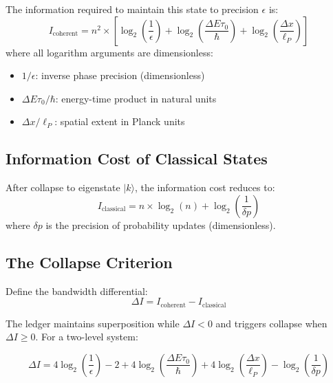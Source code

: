\documentclass[twocolumn,prd,amsmath,amssymb,aps,superscriptaddress,nofootinbib]{revtex4-2}
\begin{document}
The information required to maintain this state to precision $\epsilon$ is:
\begin{equation}
I_{\text{coherent}} = n^2 \times \left[\log_2\left(\frac{1}{\epsilon}\right) + \log_2\left(\frac{\Delta E \tau_0}{\hbar}\right) + \log_2\left(\frac{\Delta x}{\ell_P}\right)\right]
\label{eq:icoherent}
\end{equation}
where all logarithm arguments are dimensionless:
\begin{itemize}
\item $1/\epsilon$: inverse phase precision (dimensionless)
\item $\Delta E \tau_0/\hbar$: energy-time product in natural units
\item $\Delta x/\ell_P$: spatial extent in Planck units
\end{itemize}

\subsection{Information Cost of Classical States}

After collapse to eigenstate $|k\rangle$, the information cost reduces to:
\begin{equation}
I_{\text{classical}} = n \times \log_2(n) + \log_2\left(\frac{1}{\delta p}\right)
\label{eq:iclassical}
\end{equation}
where $\delta p$ is the precision of probability updates (dimensionless).

\subsection{The Collapse Criterion}

Define the bandwidth differential:
\begin{equation}
\Delta I = I_{\text{coherent}} - I_{\text{classical}}
\label{eq:deltai}
\end{equation}

The ledger maintains superposition while $\Delta I < 0$ and triggers collapse when $\Delta I \geq 0$. For a two-level system:
\begin{widetext}
\begin{equation}
\Delta I = 4\log_2\left(\frac{1}{\epsilon}\right) - 2 + 4\log_2\left(\frac{\Delta E \tau_0}{\hbar}\right) + 4\log_2\left(\frac{\Delta x}{\ell_P}\right) - \log_2\left(\frac{1}{\delta p}\right)
\end{equation}
\end{widetext}
\end{document}
